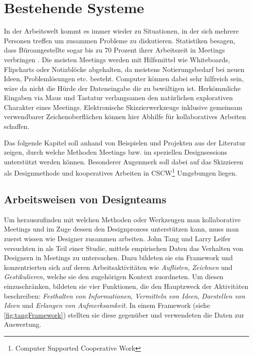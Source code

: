 \chapter{Bestehende Systeme}\label{ch:research}
In der Arbeitswelt kommt es immer wieder zu Situationen, in der sich mehrere Personen treffen um zusammen Probleme zu diskutieren. Statistiken besagen, dass Büroangestellte sogar bis zu 70 Prozent ihrer Arbeitszeit in Meetings verbringen \citep{panko:1993}. Die meisten Meetings werden mit Hilfsmittel wie Whiteboards, Flipcharts oder Notizblöcke abgehalten, da meistens Notierungsbedarf bei neuen Ideen, Problemlösungen etc. besteht. Computer können dabei sehr hilfreich sein, wäre da nicht die Hürde der Dateneingabe die zu bewältigen ist. Herkömmliche Eingaben via Maus und Tastatur verlangsamen den natürlichen explorativen Charakter eines Meetings. Elektronische Skizzierwerkzeuge inklusive gemeinsam verwendbarer Zeichenoberflächen können hier Abhilfe für kollaboratives Arbeiten schaffen. 

\medskip Das folgende Kapitel soll anhand von Beispielen und Projekten aus der Literatur zeigen, durch welche Methoden Meetings bzw. im speziellen Designsessions unterstützt werden können. Besonderer Augenmerk soll dabei auf das Skizzieren als Designmethode und kooperatives Arbeiten in CSCW\footnote{Computer Supported Cooperative Work} Umgebungen liegen.

\section{Arbeitsweisen von Designteams}
Um herauszufinden mit welchen Methoden oder Werkzeugen man kollaborative Meetings und im Zuge dessen den Designprozess unterstützen kann, muss man zuerst wissen wie Designer zusammen arbeiten. John Tang und Larry Leifer versuchten in \citep{Tang:1988p279} als Teil einer Studie, mittels empirischen Daten das Verhalten von Designern in Meetings zu untersuchen. Dazu bildeten sie ein Framework und konzentrierten sich auf deren Arbeitsaktivitäten wie \emph{Auflisten}, \emph{Zeichnen} und \emph{Gestikulieren}, welche sie den zugehörigen Kontext zuordneten. Um diesen einzuschränken, bildeten sie vier Funktionen, die den Hauptzweck der Aktivitäten beschreiben: \emph{Festhalten von Informationen}, \emph{Vermitteln von Ideen}, \emph{Darstellen von Ideen} und \emph{Erlangen von Aufmerksamkeit}. In einem Framework (siehe \autoref{fig:tangFramework}) stellten sie diese gegenüber und verwendeten die Daten zur Auswertung.


